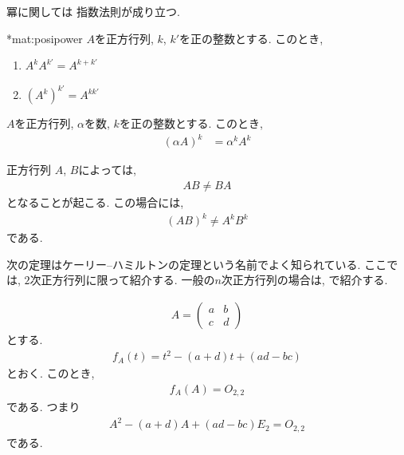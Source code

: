 冪に関しては
指数法則が成り立つ.
\begin{prop}
  \provelater**{mat:posipower}
  \label{thm:mat:posipower}
  $A$を正方行列, $k$, $k'$を正の整数とする.
  このとき,
  \begin{enumerate}
  \item {}
    $A^kA^{k'}=A^{k+k'}$
  \item {}
    $(A^k)^{k'}=A^{kk'}$
  \end{enumerate}
\end{prop}

\begin{prop}
  $A$を正方行列, $\alpha$を数, $k$を正の整数とする.
  このとき,
  \begin{align*}
    (\alpha A)^k&=\alpha^k A^{k}
  \end{align*}
\end{prop}

\begin{remark}
正方行列
$A$, $B$によっては,
\begin{align*}
  AB\neq BA
\end{align*}
となることが起こる.  この場合には,
\begin{align*}
  (AB)^k \neq A^kB^k
\end{align*}
である.
\end{remark}

次の定理はケーリー--ハミルトンの定理という名前でよく知られている.
ここでは, $2$次正方行列に限って紹介する.
一般の$n$次正方行列の場合は, で紹介する.
\begin{prop}
  \label{thm:cht:2dim}
  \begin{align*}
    A=
    \begin{pmatrix}
      a&b\\c&d
    \end{pmatrix}
  \end{align*}
  とする.
  \begin{align*}
    f_A(t)=t^2-(a+d)t+(ad-bc)
  \end{align*}
  とおく. このとき,
  \begin{align*}
    f_A(A)=O_{2,2}
  \end{align*}
  である. つまり
  \begin{align*}
    A^2-(a+d)A+(ad-bc)E_2=O_{2,2}
  \end{align*}
  である.
\end{prop}



